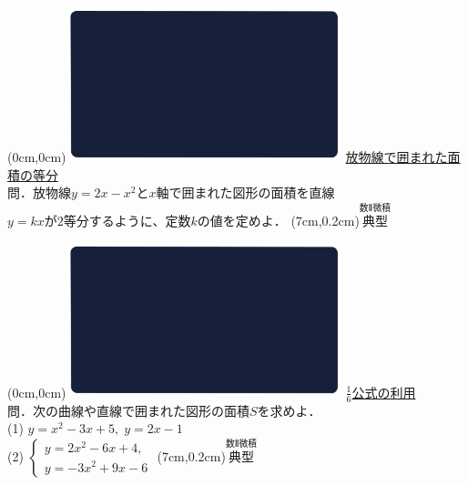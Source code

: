 \documentclass[10pt,
fleqn,
dvipdfmx,
uplatex
]{jsarticle}
\begin{document}
\newpage

\at(0cm,0cm){\includegraphics[width=8cm,bb=0 0 1920 1080]{./youtube/thumbnails/templates/smart_background/数II微積.jpeg}}
{\color{orange}\Large\underline{放物線で囲まれた面積の等分}}\vspace{0.3zw}\\
\Large 
問．放物線$y=2x-x^2$と$x$軸で囲まれた図形の面積を直線\\$y=kx$が$2$等分するように、定数$k$の値を定めよ．
\at(7cm,0.2cm){\small\color{bradorange}$\overset{\text{数Ⅱ微積}}{\text{典型}}$}

\newpage

\at(0cm,0cm){\includegraphics[width=8cm,bb=0 0 1920 1080]{./youtube/thumbnails/templates/smart_background/数II微積.jpeg}}
{\color{orange}\Large\underline{$\frac{1}{6}$公式の利用}}\vspace{0.3zw}\\
\large 
問．次の曲線や直線で囲まれた図形の面積$S$を求めよ．\\
(1)  $y=x^2-3x+5,\;y=2x-1$\\
(2)  $\left\{\begin{array}{l}y=2x^2-6x+4,\;\\y=-3x^2+9x-6\end{array}\right.$
\at(7cm,0.2cm){\small\color{bradorange}$\overset{\text{数Ⅱ微積}}{\text{典型}}$}

\newpage
\end{document}

